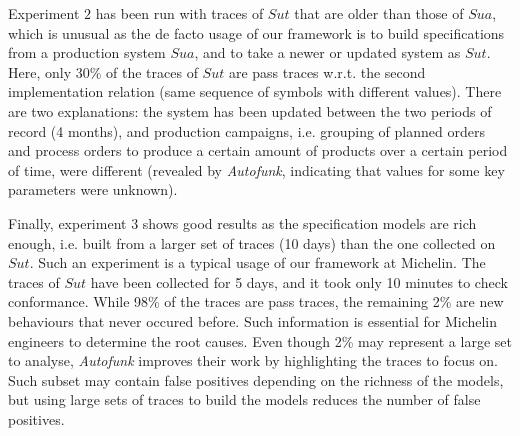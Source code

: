Experiment $2$ has been run with traces of $\mathit{Sut}$ that
are older than those of $\mathit{Sua}$, which is unusual as the
de facto usage of our framework is to build specifications from a
production system $\mathit{Sua}$, and to take a newer or updated
system as $\mathit{Sut}$.  Here, only 30\% of the traces of
$\mathit{Sut}$ are pass traces w.r.t.  the second implementation
relation (same sequence of symbols with different values). There
are two explanations: the system has been updated between the two
periods of record (4 months), and production campaigns, i.e.
grouping of planned orders and process orders to produce a
certain amount of products over a certain period of time, were
different (revealed by \textit{Autofunk}, indicating that values
for some key parameters were unknown).

Finally, experiment $3$ shows good results as the specification
models are rich enough, i.e.  built from a larger set of traces
(10 days) than the one collected on $\mathit{Sut}$. Such an
experiment is a typical usage of our framework at Michelin.  The
traces of $\mathit{Sut}$ have been collected for 5 days, and it
took only 10 minutes to check conformance. While 98\% of the
traces are pass traces, the remaining 2\% are new behaviours that
never occured before. Such information is essential for Michelin
engineers to determine the root causes. Even though 2\% may
represent a large set to analyse, \textit{Autofunk} improves
their work by highlighting the traces to focus on.  Such subset
may contain false positives depending on the richness of the
models, but using large sets of traces to build the models
reduces the number of false positives.

